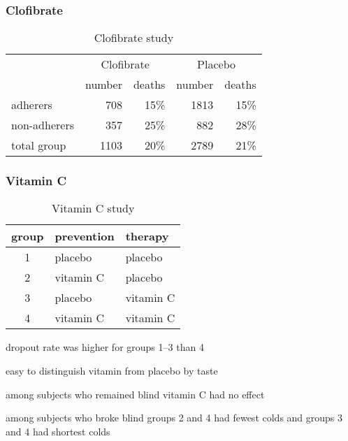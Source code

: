 \documentclass[landscape]{exam}
\begin{document}
  \subsubsection{Clofibrate}
  \begin{table}
    \centering
    \begin{tabular}{lrrrr}
      \toprule
      & \multicolumn{2}{c}{Clofibrate} & \multicolumn{2}{c}{Placebo} \\
                   & number & deaths & number & deaths \\
      \cmidrule(r){2-3} \cmidrule(r){4-5}    
      adherers     & 708    & 15\%   & 1813   & 15\% \\
      non-adherers & 357    & 25\%   & 882    & 28\% \\
      total group  & 1103   & 20\%   & 2789   & 21\% \\
      \bottomrule
    \end{tabular}
    \caption{Clofibrate study}\label{tab:clofibrate}
  \end{table}

  \subsubsection{Vitamin C}
  \begin{table}
    \centering
    \begin{tabular}{cll}
      \toprule
      group & prevention & therapy \\
      \midrule
      1     & placebo    & placebo \\
      2     & vitamin C  & placebo \\
      3     & placebo    & vitamin C \\
      4     & vitamin C  & vitamin C \\
    \end{tabular}
    \caption{Vitamin C study}\label{tab:vitamin.c}
  \end{table}

  \begin{itemize*}
    \item dropout rate was higher for groups 1--3 than 4
    \item easy to distinguish vitamin from placebo by taste
    \item among subjects who remained blind vitamin C had no effect
    \item among subjects who broke blind groups 2 and 4 had fewest colds and
      groups 3 and 4 had shortest colds
  \end{itemize*}
\end{document}

